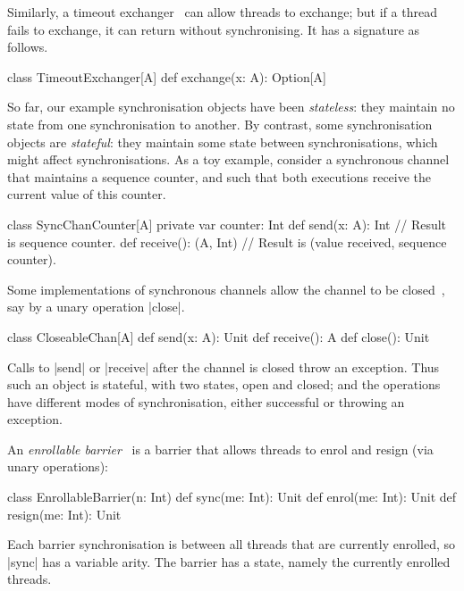 Similarly, a timeout exchanger~\cite{HSY2004,herlihy-shavit} can allow threads
to exchange; but if a thread fails to exchange, it can return without
synchronising.  It has a signature as follows.
\begin{scala}
class TimeoutExchanger[A]{
  def exchange(x: A): Option[A]
}
\end{scala}


So far, our example synchronisation objects have been \emph{stateless}: they
maintain no state from one synchronisation to another.  By contrast, some
synchronisation objects are \emph{stateful}: they maintain some state between
synchronisations, which might affect synchronisations.  As a toy example,
consider a synchronous channel that maintains a sequence counter, and such
that both executions receive the current value of this counter.
\begin{mysamepage}
\begin{scala}
class SyncChanCounter[A]{
  private var counter: Int
  def send(x: A): Int      // Result is sequence counter.
  def receive(): (A, Int)  // Result is (value received, sequence counter).
}
\end{scala}
\end{mysamepage}


Some implementations of synchronous channels allow the channel to be
closed~\cite{JCSP,sufrin:CSO}, say by a unary operation |close|.
\begin{scala}
class CloseableChan[A]{
  def send(x: A): Unit
  def receive(): A
  def close(): Unit
}
\end{scala} 
%
Calls to |send| or |receive| after the channel is closed throw an exception.
Thus such an object is stateful, with two states, open and closed; and the
operations have different modes of synchronisation, either successful or
throwing an exception.

An \emph{enrollable barrier}~\cite{alting-barrier} is a barrier
that allows threads to enrol and resign (via unary operations):
%
\begin{scala}
class EnrollableBarrier(n: Int){
  def sync(me: Int): Unit
  def enrol(me: Int): Unit
  def resign(me: Int): Unit
}
\end{scala} 
%
Each barrier synchronisation is between all threads that are currently
enrolled, so |sync| has a variable arity.  The barrier has a state, namely the
currently enrolled threads.

